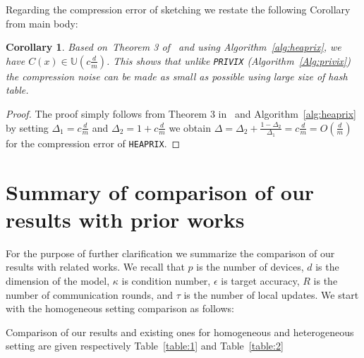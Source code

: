 \documentclass{article}
\newtheorem{corollary}{Corollary}
\begin{document}
Regarding the compression error of sketching we restate the following Corollary from main body:
\begin{corollary}
Based on~Theorem 3 of~\citep{horvath2020better} and using Algorithm~\ref{alg:heaprix}, we have $C(x)\in \mathbb{U}(c \frac{d}{m})$. This shows that unlike \texttt{PRIVIX} (Algorithm~\ref{Alg:privix}) the compression noise can be made as small as possible using large size of hash table.
\end{corollary}

\begin{proof}
The proof simply follows from Theorem 3 in~\citet{horvath2020better} and Algorithm~\ref{alg:heaprix} by setting $\Delta_1=c\frac{d}{m}$ and $\Delta_2=1+c\frac{d}{m}$ we obtain $\Delta=\Delta_2+\frac{1-\Delta_2}{\Delta_1}=c\frac{d}{m}=O\left(\frac{d}{m}\right)$ for the compression error of \texttt{HEAPRIX}. 
\end{proof}


\section{Summary of comparison of our results with prior works}\label{app:comparison}
For the purpose of further clarification we summarize the comparison of our results with related works. 
We recall that $p$ is the number of devices, $d$ is the dimension of the model, $\kappa$ is condition number, $\epsilon$ is target accuracy, $R$ is  the number of communication rounds, and $\tau$ is the number of local updates. 
We start with the homogeneous setting comparison as follows: 

Comparison of our results and existing ones for homogeneous and heterogeneous setting are given respectively Table~\ref{table:1} and Table~\ref{table:2}
\end{document}
